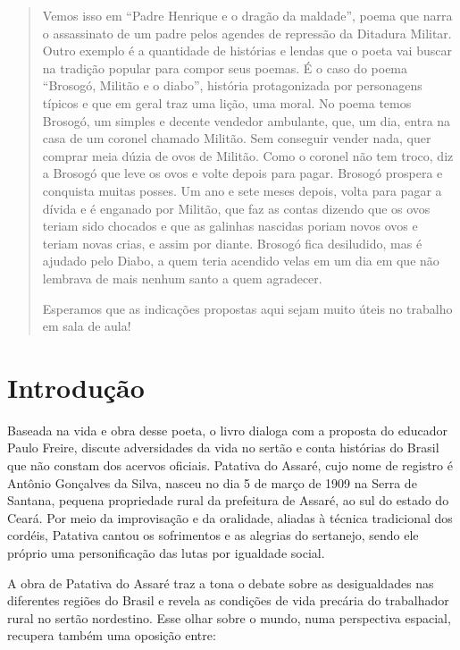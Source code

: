\documentclass[12pt]{extarticle}
\begin{document}
{\begin{abstract}
Vemos isso em ``Padre Henrique e o dragão da maldade'', poema que narra 
o assassinato de um padre pelos agendes de repressão da Ditadura Militar. 
Outro exemplo é a quantidade de histórias e lendas que o poeta vai buscar 
na tradição popular para compor seus poemas. É o caso do poema ``Brosogó, 
Militão e o diabo'', história protagonizada por personagens típicos e 
que em geral traz uma lição, uma moral. No poema temos Brosogó, um simples 
e decente vendedor ambulante, que, um dia, entra na casa de um coronel 
chamado Militão. Sem conseguir vender nada, quer comprar meia dúzia de 
ovos de Militão. Como o coronel não tem troco, diz a Brosogó que leve os 
ovos e volte depois para pagar. Brosogó prospera e conquista muitas posses. 
Um ano e sete meses depois, volta para pagar a dívida e é enganado por 
Militão, que faz as contas dizendo que os ovos teriam sido chocados e 
que as galinhas nascidas poriam novos ovos e teriam novas crias, e assim 
por diante. Brosogó fica desiludido, mas é ajudado pelo Diabo, a quem 
teria acendido velas em um dia em que não lembrava de mais nenhum santo 
a quem agradecer.

Esperamos que as indicações propostas aqui sejam muito úteis no trabalho em
sala de aula!



\end{abstract}

\tableofcontents


\section{Introdução}

Baseada na vida e obra desse poeta, o livro dialoga com a proposta do 
educador Paulo Freire, discute adversidades da vida no sertão e conta 
histórias do Brasil que não constam dos acervos oficiais. Patativa do Assaré, 
cujo nome de registro é Antônio Gonçalves da Silva, nasceu no dia 5 de 
março de 1909 na Serra de Santana, pequena propriedade rural da prefeitura 
de Assaré, ao sul do estado do Ceará. Por meio da improvisação e da 
oralidade, aliadas à técnica tradicional dos cordéis, Patativa cantou os 
sofrimentos e as alegrias do sertanejo, sendo ele próprio uma personificação 
das lutas por igualdade social.

A obra de Patativa do Assaré traz a tona o debate sobre as desigualdades 
nas diferentes regiões do Brasil e revela as condições de vida precária do trabalhador rural no sertão nordestino. Esse olhar sobre o mundo, numa 
perspectiva espacial, recupera também uma oposição entre:

}
\end{document}
